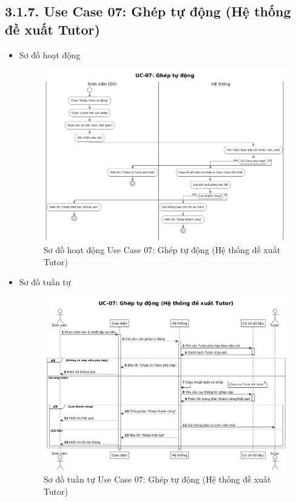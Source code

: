 \subsection*{3.1.7. Use Case 07: Ghép tự động (Hệ thống đề xuất Tutor)}
\begin{itemize}
    \item Sơ đồ hoạt động
    \begin{figure}[H]
    \centering
    \includegraphics[scale=0.35 ]{Picture/ACUC07.png}
    \caption{Sơ đồ hoạt động Use Case 07: Ghép tự động (Hệ thống đề xuất Tutor)}
    \end{figure}
    \item Sơ đồ tuần tự
    \begin{figure}[H]
    \centering
    \includegraphics[scale=0.35 ]{Picture/SEUC07.png}
    \caption{Sơ đồ tuần tự Use Case 07: Ghép tự động (Hệ thống đề xuất Tutor)}
    \end{figure}
\end{itemize}
